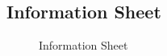 \documentclass{l4proj}
\begin{document}
\begin{appendices}
\section{Information Sheet}
\begin{figure}[H]
\centering
{}
\caption{Information Sheet}
\label{appendix:infosheet}
\end{figure}


\end{appendices}
\end{document}
